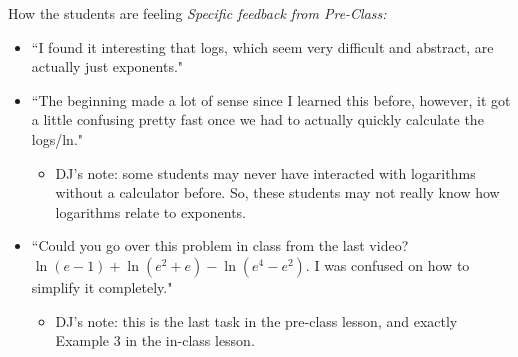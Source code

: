 \documentclass{beamer}
\begin{document}
\begin{frame}{How the students are feeling}
{\it Specific feedback from Pre-Class:}
\begin{itemize}
\item ``I found it interesting that logs, which seem very difficult and abstract, are actually just exponents."
\item ``The beginning made a lot of sense since I learned this before, however, it got a little confusing pretty fast once we had to actually quickly calculate the logs/ln."
    \begin{itemize}
    \item DJ's note: some students may never have interacted with logarithms without a calculator before. So, these students may not really know how logarithms relate to exponents.
    \end{itemize}
\item ``Could you go over this problem in class from the last video? $\ln(e-1) + \ln(e^2+e) - \ln(e^4-e^2)$. I was confused on how to simplify it completely."
    \begin{itemize}
    \item DJ's note: this is the last task in the pre-class lesson, and exactly Example 3 in the in-class lesson.
    \end{itemize}
\end{itemize}
\end{frame}
\end{document}
